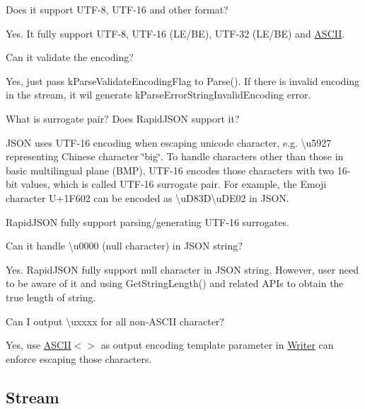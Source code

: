 \begin{DoxyEnumerate}
\item Does it support U\+T\+F-\/8, U\+T\+F-\/16 and other format?

Yes. It fully support U\+T\+F-\/8, U\+T\+F-\/16 (L\+E/\+BE), U\+T\+F-\/32 (L\+E/\+BE) and \hyperlink{struct_a_s_c_i_i}{A\+S\+C\+II}.
\item Can it validate the encoding?

Yes, just pass {\ttfamily k\+Parse\+Validate\+Encoding\+Flag} to {\ttfamily Parse()}. If there is invalid encoding in the stream, it wil generate {\ttfamily k\+Parse\+Error\+String\+Invalid\+Encoding} error.
\item What is surrogate pair? Does Rapid\+J\+S\+ON support it?

J\+S\+ON uses U\+T\+F-\/16 encoding when escaping unicode character, e.\+g. {\ttfamily \textbackslash{}u5927} representing Chinese character \char`\"{}big\char`\"{}. To handle characters other than those in basic multilingual plane (B\+MP), U\+T\+F-\/16 encodes those characters with two 16-\/bit values, which is called U\+T\+F-\/16 surrogate pair. For example, the Emoji character U+1\+F602 can be encoded as {\ttfamily \textbackslash{}u\+D83D\textbackslash{}u\+D\+E02} in J\+S\+ON.

Rapid\+J\+S\+ON fully support parsing/generating U\+T\+F-\/16 surrogates.
\item Can it handle {\ttfamily \textbackslash{}u0000} (null character) in J\+S\+ON string?

Yes. Rapid\+J\+S\+ON fully support null character in J\+S\+ON string. However, user need to be aware of it and using {\ttfamily Get\+String\+Length()} and related A\+P\+Is to obtain the true length of string.
\item Can I output {\ttfamily \textbackslash{}uxxxx} for all non-\/\+A\+S\+C\+II character?

Yes, use {\ttfamily \hyperlink{struct_a_s_c_i_i}{A\+S\+C\+II}$<$$>$} as output encoding template parameter in {\ttfamily \hyperlink{class_writer}{Writer}} can enforce escaping those characters.
\end{DoxyEnumerate}

\subsection*{Stream}


